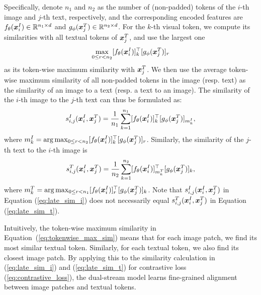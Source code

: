 Specifically, 
denote $n_1$ and $n_2$ as the  number of (non-padded) tokens of the $i$-th image  and $j$-th text, respectively, 
and the corresponding encoded features 
are $f_\theta({\bm{x}}^I_i) \in \mathbb{R}^{n_1 \times d}$ and $g_\phi({\bm{x}}^T_j) \in \mathbb{R}^{n_2 \times d}$.
For the $k$-th visual token, we compute its similarities with all textual tokens of ${\bm{x}}^T_j$,  and use the largest one 
\begin{equation}
\max_{0\le r < n_2} [f_\theta({\bm{x}}^I_i)]_k^\top [g_\phi({\bm{x}}^T_j)]_r
\label{eq:tokenwise_max_sim}
\end{equation} 
as its  token-wise maximum similarity with ${\bm{x}}^T_j$.
We then use the average token-wise maximum similarity of all non-padded tokens 
in the image (resp. text) as the similarity of an image to a text (resp. a text to an image). 
The similarity of the $i$-th image to the $j$-th text
can thus be formulated as:
\begin{equation}
s_{i,j}^I ({\bm{x}}^I_i, {\bm{x}}^T_j)  = \frac{1}{n_1}\sum_{k=1}^{n_1} [f_\theta({\bm{x}}^I_i)]_k^\top [g_\phi({\bm{x}}^T_j)]_{m_k^I}, \label{eq:late_sim_i}
\end{equation}
where $m_k^I = \arg \max_{0\le r < n_2} [f_\theta({\bm{x}}^I_i)]_k^\top [g_\phi({\bm{x}}^T_j)]_r$.
Similarly, the similarity of the $j$-th text to the $i$-th image is
\begin{equation}
s_{i,j}^T ({\bm{x}}^I_i, {\bm{x}}^T_j)  = \frac{1}{n_2}\sum_{k=1}^{n_2} [f_\theta({\bm{x}}^I_i)]_{m_k^T}^\top [g_\phi({\bm{x}}^T_j)]_k, \label{eq:late_sim_t}
\end{equation}
where $m_k^T = \arg \max_{0\le r < n_1} [f_\theta({\bm{x}}^I_i)]_r^\top [g_\phi({\bm{x}}^T_j)]_k$.
Note that $s_{i,j}^I ({\bm{x}}^I_i, {\bm{x}}^T_j)$ in   Equation (\ref{eq:late_sim_i}) does not necessarily equal $s_{i,j}^T ({\bm{x}}^I_i, {\bm{x}}^T_j)$ in Equation (\ref{eq:late_sim_t}).


\begin{remark}
\label{rmk:late_interaction_loss}
Intuitively, the token-wise maximum similarity in Equation~(\ref{eq:tokenwise_max_sim}) means that
for each image patch, we find its most similar textual token.
Similarly, for each textual token, we also find its closest image patch.
By applying this to the similarity calculation in (\ref{eq:late_sim_i}) and (\ref{eq:late_sim_t}) 
for contrastive loss (\ref{eq:contrastive_loss}),
 the dual-stream model learns fine-grained alignment between image patches and textual tokens.
\end{remark}



